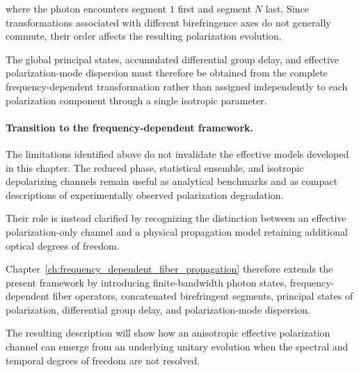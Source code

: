 where the photon encounters segment \(1\) first and segment \(N\) last. Since transformations associated with different birefringence axes do not generally commute, their order affects the resulting polarization evolution.

\medskip

The global principal states, accumulated differential group delay, and effective polarization-mode dispersion must therefore be obtained from the complete frequency-dependent transformation rather than assigned independently to each polarization component through a single isotropic parameter.

\medskip

\paragraph{Transition to the frequency-dependent framework.}

The limitations identified above do not invalidate the effective models developed in this chapter. The reduced phase, statistical ensemble, and isotropic depolarizing channels remain useful as analytical benchmarks and as compact descriptions of experimentally observed polarization degradation.

Their role is instead clarified by recognizing the distinction between an effective polarization-only channel and a physical propagation model retaining additional optical degrees of freedom.

\medskip

Chapter~\ref{ch:frequency_dependent_fiber_propagation} therefore extends the present framework by introducing finite-bandwidth photon states, frequency-dependent fiber operators, concatenated birefringent segments, principal states of polarization, differential group delay, and polarization-mode dispersion.

The resulting description will show how an anisotropic effective polarization channel can emerge from an underlying unitary evolution when the spectral and temporal degrees of freedom are not resolved.